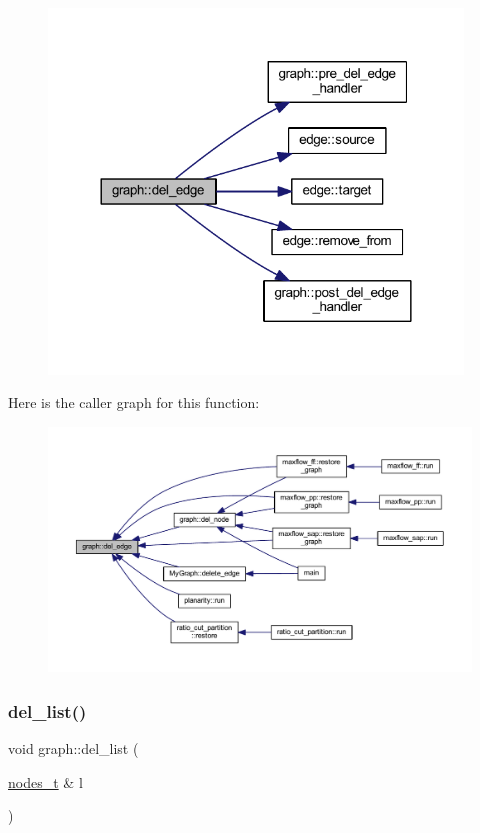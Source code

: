 \begin{figure}[H]
\begin{center}
\leavevmode
\includegraphics[width=312pt]{classgraph_ad9356508c49c542dfd4b7169297387c6_cgraph}
\end{center}
\end{figure}
Here is the caller graph for this function\+:
\nopagebreak
\begin{figure}[H]
\begin{center}
\leavevmode
\includegraphics[width=350pt]{classgraph_ad9356508c49c542dfd4b7169297387c6_icgraph}
\end{center}
\end{figure}
\mbox{\label{classgraph_a23f0a5fb311b7d71bb9dfc4e8aedef35}} 
\subsubsection{\texorpdfstring{del\+\_\+list()}{del\_list()}\hspace{0.1cm}{\footnotesize\ttfamily [1/2]}}
{\footnotesize\ttfamily void graph\+::del\+\_\+list (\begin{DoxyParamCaption}\item[{\mbox{\hyperlink{edge_8h_a22ac17689106ba21a84e7bc54d1199d6}{nodes\+\_\+t}} \&}]{l }\end{DoxyParamCaption})\hspace{0.3cm}{\ttfamily [private]}}




